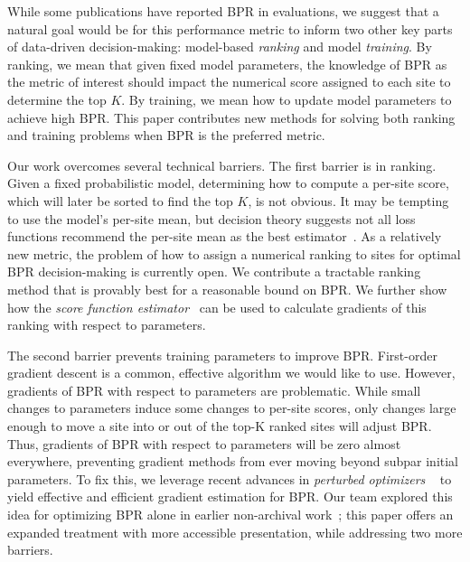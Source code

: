 While some publications have reported BPR in evaluations, 
we suggest that a natural goal would be for this performance metric to inform two other key parts of data-driven decision-making: model-based \emph{ranking} and 
model \emph{training}. By ranking, we mean that given fixed model parameters, the knowledge of BPR as the metric of interest should impact the numerical score assigned to each site to determine the top $K$. By training, we mean how to update model parameters to achieve high BPR.
This paper contributes new methods for solving both ranking and training problems when BPR is the preferred metric.


Our work overcomes several technical barriers.
The first barrier is in ranking. Given a fixed probabilistic model, determining how to compute a per-site score, which will later be sorted to find the top $K$, is not obvious. It may be tempting to use the model's per-site mean, but decision theory suggests not all loss functions recommend the per-site mean as the best estimator~\citep{berger2013StatisticalDecisionTheory,murphy2022Sec5_1DecisionTheory}. As a relatively new metric, the problem of how to assign a numerical ranking to sites for optimal BPR decision-making is currently open. We contribute a tractable ranking method that is provably best for a reasonable bound on BPR. We further show how the \emph{score function estimator}~\citep{kleijnen1996OptimizationScoreFunction,mohamed2020MonteCarloGradient} can be used to calculate gradients of this ranking with respect to parameters.

The second barrier prevents training parameters to improve BPR. First-order gradient descent is a common, effective algorithm we would like to use. However, gradients of BPR with respect to parameters are problematic. 
While small changes to parameters induce some changes to per-site scores, only changes large enough to move a site into or out of the top-K ranked sites will adjust BPR. Thus, gradients of BPR with respect to parameters will be zero almost everywhere, preventing gradient methods from ever moving beyond subpar initial parameters. To fix this, we leverage recent advances in \emph{perturbed optimizers} ~\citep{abernethyPerturbationTechniquesOnline2016,berthetLearningDifferentiablePerturbed2020} to yield effective and efficient gradient estimation for BPR.
Our team explored this idea for optimizing BPR alone in earlier non-archival work~\citep{heutonlearning_dlm}; this paper offers an expanded treatment with more accessible presentation, while addressing two more barriers.

